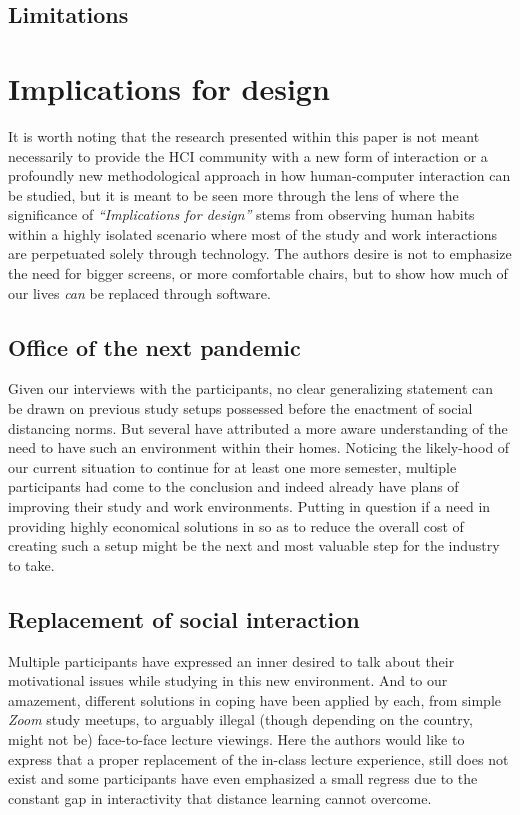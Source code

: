 \documentclass{sigchi}
\begin{document}
\subsection{Limitations}

\section{Implications for design}

It is worth noting that the research presented within this paper is not meant necessarily to provide the HCI community with a new form of interaction or a profoundly new methodological approach in how human-computer interaction can be studied, but it is meant to be seen more through the lens of \cite{dourish_implications_2006} where the significance of \emph{``Implications for design''} stems from observing human habits within a highly isolated scenario where most of the study and work interactions are perpetuated solely through technology. The authors desire is not to emphasize the need for bigger screens, or more comfortable chairs, but to show how much of our lives \emph{can} be replaced through software.

\subsection{Office of the next pandemic}

Given our interviews with the participants, no clear generalizing statement can be drawn on previous study setups possessed before the enactment of social distancing norms. But several have attributed a more aware understanding of the need to have such an environment within their homes. 
Noticing the likely-hood of our current situation to continue for at least one more semester, multiple participants had come to the conclusion and indeed already have plans of improving their study and work environments. Putting in question if a need in providing highly economical solutions in so as to reduce the overall cost of creating such a setup might be the next and most valuable step for the industry to take.

\subsection{Replacement of social interaction}

Multiple participants have expressed an inner desired to talk about their motivational issues while studying in this new environment. And to our amazement, different solutions in coping have been applied by each, from simple \emph{Zoom} study meetups, to arguably illegal (though depending on the country, might not be) face-to-face lecture viewings. Here the authors would like to express that a proper replacement of the in-class lecture experience, still does not exist and some participants have even emphasized a small regress due to the constant gap in interactivity that distance learning cannot overcome.
\end{document}
